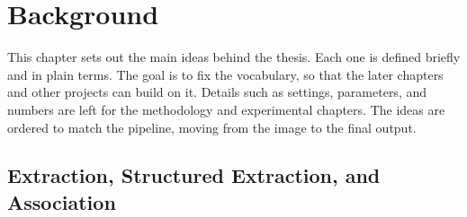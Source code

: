 %
%
%
%
%

\chapter{Background}\label{chap:background}

This chapter sets out the main ideas behind the thesis. Each one is defined
briefly and in plain terms. The goal is to fix the vocabulary, so that the later
chapters and other projects can build on it. Details such as settings,
parameters, and numbers are left for the methodology and experimental chapters.
The ideas are ordered to match the pipeline, moving from the image to the final
output.
\section{Extraction, Structured Extraction, and Association}\label{sec:bgd-extraction}

